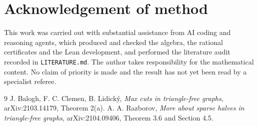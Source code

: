 \documentclass[11pt]{article}
\theoremstyle{remark}
\begin{document}
\section*{Acknowledgement of method}
This work was carried out with substantial assistance from AI coding and
reasoning agents, which produced and checked the algebra, the rational
certificates and the Lean development, and performed the literature audit
recorded in \texttt{LITERATURE.md}. The author takes responsibility for the
mathematical content. No claim of priority is made and the result has not yet
been read by a specialist referee.

\begin{thebibliography}{9}
 J. Balogh, F. C. Clemen, B. Lidick\'y,
\emph{Max cuts in triangle-free graphs}, arXiv:2103.14179, Theorem 2(a).
 A. A. Razborov,
\emph{More about sparse halves in triangle-free graphs},
arXiv:2104.09406, Theorem 3.6 and Section 4.5.
\end{thebibliography}
\end{document}
